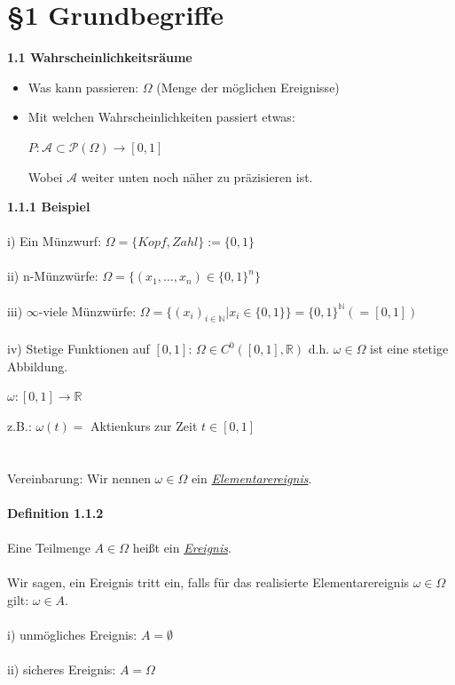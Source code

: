 \documentclass[10pt,a4paper]{report}
\numberwithin{equation}{section}
\numberwithin{figure}{section}
\theoremstyle{plain}
\theoremstyle{definition}
\theoremstyle{plain}
\theoremstyle{definition}
\theoremstyle{remark}
\theoremstyle{plain}
\begin{document}
\chapter*{\S 1 \qquad Grundbegriffe}
\Large{\textbf{1.1 Wahrscheinlichkeitsräume}}\normalsize
\begin{itemize}
\item Was kann passieren: $\Omega$ (Menge der möglichen Ereignisse)
\item Mit welchen Wahrscheinlichkeiten passiert etwas:
\begin{center}
$P: \mathcal{A} \subset \mathcal{P}(\Omega) \rightarrow [0,1]$
\end{center}
Wobei $\mathcal{A}$ weiter unten noch näher zu präzisieren ist.
\end{itemize}
\textbf{1.1.1 Beispiel}\\\\
i) Ein Münzwurf: $\Omega=\{Kopf, Zahl\}:=\{0,1\}$\\\\
ii) n-Münzwürfe: $\Omega=\{(x_1,\dots,x_n) \in \{0,1\}^n\}$\\\\
iii) $\infty$-viele Münzwürfe: $\Omega=\{(x_i)_{i\in \mathbb{N}}|x_i \in \{0,1\}\}=\{0,1\}^\mathbb{N}(=[0,1])$\\\\
iv) Stetige Funktionen auf $[0,1]$: $\Omega \in C^0([0,1],\mathbb{R})$ d.h. $\omega \in \Omega$ ist eine stetige Abbildung.
\begin{center}
$\omega: [0,1] \rightarrow \mathbb{R}$
\end{center}
z.B.: $\omega(t)=$ Aktienkurs zur Zeit $t \in [0,1]$\\\\\\
Vereinbarung: Wir nennen $\omega \in \Omega$ ein \underline{\textit{Elementarereignis}}.\\\\
\textbf{Definition 1.1.2}\\\\
Eine Teilmenge $A \in \Omega$ heißt ein \underline{\textit{Ereignis}}.\\\\
Wir sagen, ein Ereignis tritt ein, falls für das realisierte Elementarereignis $\omega \in \Omega$ gilt: $\omega \in A$.\\\\
i) unmögliches Ereignis: $A=\emptyset$\\\\
ii) sicheres Ereignis: $A=\Omega$\\\\
\end{document}

